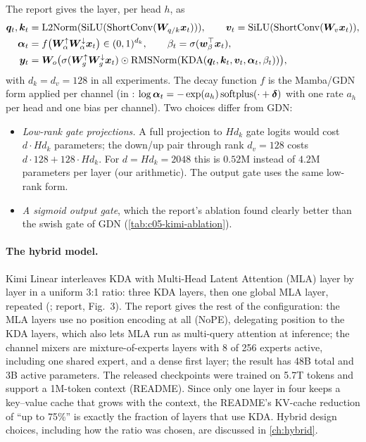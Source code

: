 The report gives the layer, per head $h$, as
\begin{align}
  \bm{q}_t, \bm{k}_t &= \mathrm{L2Norm}(\operatorname{SiLU}(\mathrm{ShortConv}(\bm{W}_{q/k}\bm{x}_t))),\qquad
  \bm{v}_t = \operatorname{SiLU}(\mathrm{ShortConv}(\bm{W}_v\bm{x}_t)), \nonumber\\
  \bm{\alpha}_t &= f\big(\bm{W}_\alpha^{\uparrow}\bm{W}_\alpha^{\downarrow}\bm{x}_t\big) \in (0,1)^{d_k},\qquad
  \beta_t = \sigma(\bm{w}_\beta^{\top}\bm{x}_t), \label{eq:c05-kda-layer}\\
  \bm{y}_t &= \bm{W}_o\big(\sigma(\bm{W}_g^{\uparrow}\bm{W}_g^{\downarrow}\bm{x}_t)\odot
          \operatorname{RMSNorm}(\mathrm{KDA}(\bm{q}_t,\bm{k}_t,\bm{v}_t,\bm{\alpha}_t,\beta_t))\big), \nonumber
\end{align}
with $d_k = d_v = 128$ in all experiments. The decay function $f$ is the Mamba/GDN form applied
per channel (in \fla{}: $\log\bm{\alpha}_t = -\exp(a_h)\,\mathrm{softplus}(\cdot + \bm\delta)$ with
one rate $a_h$ per head and one bias per channel). Two choices differ from GDN:
\begin{itemize}
  \item \emph{Low-rank gate projections.} A full projection to $H d_k$ gate logits would cost
  $d\cdot Hd_k$ parameters; the down/up pair through rank $d_v = 128$ costs $d\cdot128 + 128\cdot Hd_k$.
  For $d = Hd_k = 2048$ this is $0.52$M instead of $4.2$M parameters per layer (our arithmetic).
  The output gate uses the same low-rank form.
  \item \emph{A sigmoid output gate}, which the report's ablation found clearly better than the
  swish gate of GDN (\cref{tab:c05-kimi-ablation}).
\end{itemize}

\paragraph{The hybrid model.} Kimi Linear interleaves KDA with Multi-Head Latent Attention (MLA)
\citep{deepseek2024v2} layer by layer in a uniform 3:1 ratio: three KDA layers, then one global MLA
layer, repeated (; report, Fig.~3). The report
gives the rest of the configuration: the MLA layers use no position encoding at all (NoPE),
delegating position to the KDA layers, which also lets MLA run as multi-query attention at
inference; the channel mixers are mixture-of-experts layers with 8 of 256 experts active,
including one shared expert, and a dense first layer; the result has 48B total and 3B active
parameters. The released checkpoints were trained on 5.7T tokens and support a 1M-token context
(README). Since only one layer in four keeps a key--value cache that grows with the context, the
README's KV-cache reduction of ``up to 75\%'' is exactly the fraction of layers that use KDA. Hybrid design choices, including how the ratio was chosen, are discussed in
\cref{ch:hybrid}.


